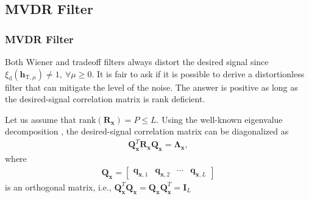 \documentclass[10pt,pdflatex,headrule,landscape]{beamer}
\begin{document}
\subsection{MVDR Filter}
\begin{frame}
    \frametitle{MVDR Filter}

Both Wiener and tradeoff filters always distort the desired signal since $\xi_{\mathrm{d}}\left( \mathbf{h}_{\mathrm{T},\mu} \right) \neq 1, \ \forall \mu \geq 0$. It is fair to ask if it is possible to derive a distortionless filter that can mitigate the level of the noise. The answer is positive as long as the desired-signal correlation matrix is rank deficient.

Let us assume that $\mathrm{rank}\left( \mathbf{R}_{\mathbf{x}} \right) = P \leq L$. Using the well-known eigenvalue decomposition \cite{C2-golub1996}, the desired-signal correlation matrix can be diagonalized as
\begin{eqnarray}
\label{C2-Rx-eig}
 \mathbf{Q}_{\mathbf{x}}^T \mathbf{R}_{\mathbf{x}} \mathbf{Q}_{\mathbf{x}} = \mathbf{\Lambda}_{\mathbf{x}},
\end{eqnarray}
where
\begin{eqnarray}
 \mathbf{Q}_{\mathbf{x}} =
 \left[ \begin{array}{cccc} \mathbf{q}_{\mathbf{x},1} & \mathbf{q}_{\mathbf{x},2} & \cdots &
 \mathbf{q}_{\mathbf{x},L} \end{array} \right]
\end{eqnarray}
is an orthogonal matrix, i.e., $\mathbf{Q}_{\mathbf{x}}^T \mathbf{Q}_{\mathbf{x}} = \mathbf{Q}_{\mathbf{x}} \mathbf{Q}_{\mathbf{x}}^T = \mathbf{I}_L$

\end{frame}
\end{document}
